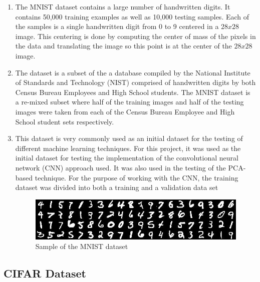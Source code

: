 \documentclass{article}
\begin{document}
\begin{enumerate}
  \item The MNIST dataset contains a large number of handwritten digits. It contains 50,000 training
        examples as well as 10,000 testing samples. Each of the samples is a single handwritten digit
        from 0 to 9 centered in a $28x28$ image. This centering is done by computing the center of mass
        of the pixels in the data and translating the image so this point is at the center of the $28x28$
        image. 
  \item The dataset is a subset of the a database compiled by the National Institute of Standards and Technology
        (NIST) comprised of handwritten digits by both Census Bureau Employees and High School students. The MNIST 
        dataset is a re-mixed subset where half of the training images and half of the testing images were taken 
        from each of the Census Bureau Employee and High School student sets respectively.
  \item This dataset is very commonly used as an initial dataset for the testing of different machine learning
        techniques. For this project, it was used as the initial dataset for testing the implementation of the
        convolutional neural network (CNN) approach used. It was also used in the testing of the PCA-based technique.
        For the purpose of working with the CNN, the training dataset was divided into both a training and a validation
        data set
        \FloatBarrier
        \begin{figure}
          \caption{Sample of the MNIST dataset}
          \centering
          \includegraphics[scale=0.5]{images/mnist_dataset_example}
        \end{figure}
        \FloatBarrier
\end{enumerate}

\subsection{CIFAR Dataset}
\end{document}
